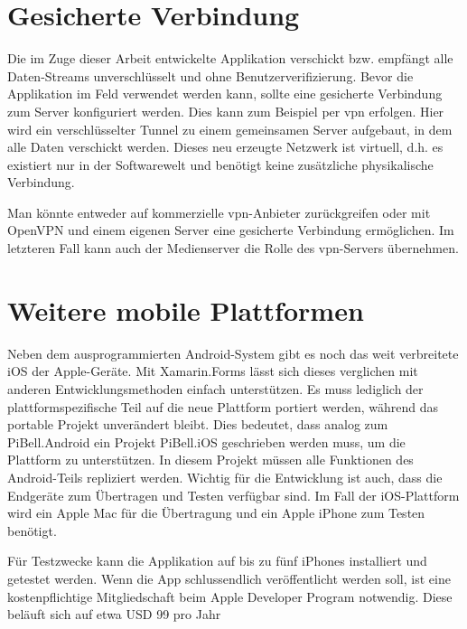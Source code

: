 \wip
\section{Gesicherte Verbindung}%
Die im Zuge dieser Arbeit entwickelte Applikation verschickt bzw. empfängt alle Daten-Streams unverschlüsselt und ohne Benutzerverifizierung.
Bevor die Applikation im Feld verwendet werden kann, sollte eine gesicherte Verbindung zum Server konfiguriert werden.
Dies kann zum Beispiel per \ac{vpn} erfolgen.
Hier wird ein verschlüsselter Tunnel zu einem gemeinsamen Server aufgebaut, in dem alle Daten verschickt werden.
Dieses neu erzeugte Netzwerk ist virtuell, d.h. es existiert nur in der Softwarewelt und benötigt keine zusätzliche physikalische Verbindung.\par
Man könnte entweder auf kommerzielle \ac{vpn}-Anbieter zurückgreifen oder mit Open\-VPN und einem eigenen Server eine gesicherte Verbindung ermöglichen.
Im letzteren Fall kann auch der Medienserver die Rolle des \ac{vpn}-Servers übernehmen.
\section{Weitere mobile Plattformen}
Neben dem ausprogrammierten Android-System gibt es noch das weit verbreitete iOS der Apple-Geräte.
Mit Xamarin.Forms lässt sich dieses verglichen mit anderen Entwicklungsmethoden einfach unterstützen.
Es muss lediglich der plattformspezifische Teil auf die neue Plattform portiert werden, während das portable Projekt unverändert bleibt.
Dies bedeutet, dass analog zum PiBell.Android ein Projekt PiBell.iOS geschrieben werden muss, um die Plattform zu unterstützen.
In diesem Projekt müssen alle Funktionen des Android-Teils repliziert werden.
Wichtig für die Entwicklung ist auch, dass die Endgeräte zum Übertragen und Testen verfügbar sind.
Im Fall der iOS-Plattform wird ein Apple Mac für die Übertragung und ein Apple iPhone zum Testen benötigt.\par

Für Testzwecke kann die Applikation auf bis zu fünf iPhones installiert und getestet werden.
Wenn die App schlussendlich veröffentlicht werden soll, ist eine kostenpflichtige Mitgliedschaft beim Apple Developer Program notwendig.
Diese beläuft sich auf etwa USD 99 pro Jahr \cite[vgl.][Integrated Development Environment Availability]{msdoc-xamarin-fundamentals}

